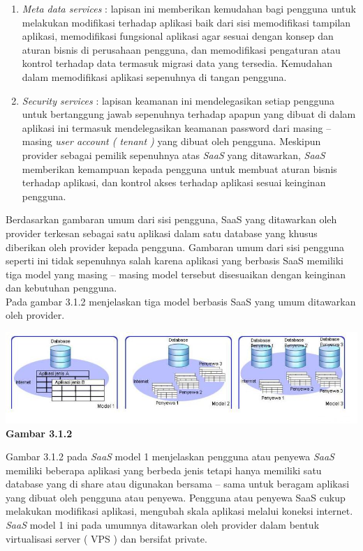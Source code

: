 \begin{enumerate}
\item \textit{Meta data services} : lapisan ini memberikan kemudahan bagi pengguna untuk melakukan modifikasi terhadap aplikasi baik dari sisi memodifikasi tampilan aplikasi, memodifikasi fungsional aplikasi agar sesuai dengan konsep dan aturan bisnis di perusahaan pengguna, dan memodifikasi pengaturan atau kontrol terhadap data termasuk migrasi data yang tersedia. Kemudahan dalam memodifikasi aplikasi sepenuhnya di tangan pengguna.
\item \textit{Security services} : lapisan keamanan ini mendelegasikan setiap pengguna untuk bertanggung jawab sepenuhnya terhadap apapun yang dibuat di dalam aplikasi ini termasuk mendelegasikan keamanan password dari masing – masing \textit{user account ( tenant )} yang dibuat oleh pengguna. Meskipun provider sebagai pemilik sepenuhnya atas \textit{SaaS} yang ditawarkan, \textit{SaaS} memberikan kemampuan kepada pengguna untuk membuat aturan bisnis terhadap aplikasi, dan kontrol akses terhadap aplikasi sesuai keinginan pengguna.			
\end{enumerate}
Berdasarkan gambaran umum dari sisi pengguna, SaaS yang ditawarkan oleh provider terkesan sebagai satu aplikasi dalam satu database yang khusus diberikan oleh provider kepada pengguna. Gambaran umum dari sisi pengguna seperti ini tidak sepenuhnya salah karena aplikasi yang berbasis SaaS memiliki tiga model yang masing – masing model tersebut disesuaikan dengan keinginan dan kebutuhan pengguna.\\
\tab Pada gambar 3.1.2 menjelaskan tiga model berbasis SaaS yang umum ditawarkan oleh provider.\\
\begin{center}
\includegraphics[scale=0.8]{Gambar312.jpg} \\
\textbf{Gambar 3.1.2}
\end{center}
Gambar 3.1.2 pada \textit{SaaS} model 1 menjelaskan pengguna atau penyewa \textit{SaaS} memiliki beberapa aplikasi yang berbeda jenis tetapi hanya memiliki satu database yang di share atau digunakan bersama – sama untuk beragam aplikasi yang dibuat oleh pengguna atau penyewa. Pengguna atau penyewa SaaS cukup melakukan modifikasi aplikasi, mengubah skala aplikasi melalui koneksi internet. \textit{SaaS} model 1 ini pada umumnya ditawarkan oleh provider dalam bentuk virtualisasi server ( VPS ) dan bersifat private.\\
